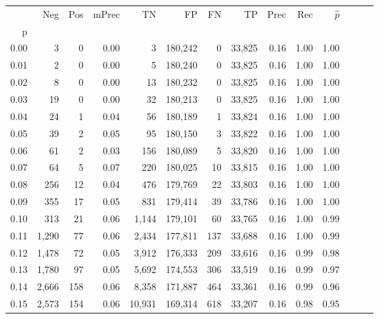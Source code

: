 \begin{tabular}{rrrrrrrrrrrrrr}
\toprule
{} &    Neg &  Pos & mPrec &       TN &       FP &      FN &      TP &  Prec &   Rec & $\hat{p}$ \\
p    &        &      &       &          &          &         &         &       &       &           \\
\midrule
0.00 &      3 &    0 &  0.00 &        3 &  180,242 &       0 &  33,825 &  0.16 &  1.00 &      1.00 \\
0.01 &      2 &    0 &  0.00 &        5 &  180,240 &       0 &  33,825 &  0.16 &  1.00 &      1.00 \\
0.02 &      8 &    0 &  0.00 &       13 &  180,232 &       0 &  33,825 &  0.16 &  1.00 &      1.00 \\
0.03 &     19 &    0 &  0.00 &       32 &  180,213 &       0 &  33,825 &  0.16 &  1.00 &      1.00 \\
0.04 &     24 &    1 &  0.04 &       56 &  180,189 &       1 &  33,824 &  0.16 &  1.00 &      1.00 \\
0.05 &     39 &    2 &  0.05 &       95 &  180,150 &       3 &  33,822 &  0.16 &  1.00 &      1.00 \\
0.06 &     61 &    2 &  0.03 &      156 &  180,089 &       5 &  33,820 &  0.16 &  1.00 &      1.00 \\
0.07 &     64 &    5 &  0.07 &      220 &  180,025 &      10 &  33,815 &  0.16 &  1.00 &      1.00 \\
0.08 &    256 &   12 &  0.04 &      476 &  179,769 &      22 &  33,803 &  0.16 &  1.00 &      1.00 \\
0.09 &    355 &   17 &  0.05 &      831 &  179,414 &      39 &  33,786 &  0.16 &  1.00 &      1.00 \\
0.10 &    313 &   21 &  0.06 &    1,144 &  179,101 &      60 &  33,765 &  0.16 &  1.00 &      0.99 \\
0.11 &  1,290 &   77 &  0.06 &    2,434 &  177,811 &     137 &  33,688 &  0.16 &  1.00 &      0.99 \\
0.12 &  1,478 &   72 &  0.05 &    3,912 &  176,333 &     209 &  33,616 &  0.16 &  0.99 &      0.98 \\
0.13 &  1,780 &   97 &  0.05 &    5,692 &  174,553 &     306 &  33,519 &  0.16 &  0.99 &      0.97 \\
0.14 &  2,666 &  158 &  0.06 &    8,358 &  171,887 &     464 &  33,361 &  0.16 &  0.99 &      0.96 \\
0.15 &  2,573 &  154 &  0.06 &   10,931 &  169,314 &     618 &  33,207 &  0.16 &  0.98 &      0.95 \\

\end{tabular}
